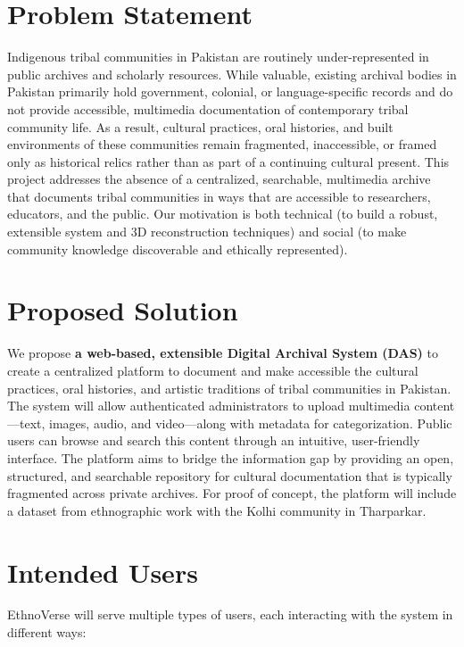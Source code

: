\section{Problem Statement}

Indigenous tribal communities in Pakistan are routinely under-represented in public archives and scholarly resources. While valuable, existing archival bodies in Pakistan primarily hold government, colonial, or language-specific records and do not provide accessible, multimedia documentation of contemporary tribal community life. As a result, cultural practices, oral histories, and built environments of these communities remain fragmented, inaccessible, or framed only as historical relics rather than as part of a continuing cultural present. This project addresses the absence of a centralized, searchable, multimedia archive that documents tribal communities in ways that are accessible to researchers, educators, and the public. Our motivation is both technical (to build a robust, extensible system and 3D reconstruction techniques) and social (to make community knowledge discoverable and ethically represented).

\section{Proposed Solution}

We propose \textbf{a web-based, extensible Digital Archival System (DAS)} to create a centralized platform to document and make accessible the cultural practices, oral histories, and artistic traditions of tribal communities in Pakistan. The system will allow authenticated administrators to upload multimedia content—text, images, audio, and video—along with metadata for categorization. Public users can browse and search this content through an intuitive, user-friendly interface. The platform aims to bridge the information gap by providing an open, structured, and searchable repository for cultural documentation that is typically fragmented across private archives. For proof of concept, the platform will include a dataset from ethnographic work with the Kolhi community in Tharparkar.

\section{Intended Users}

EthnoVerse will serve multiple types of users, each interacting with the system in different ways:

